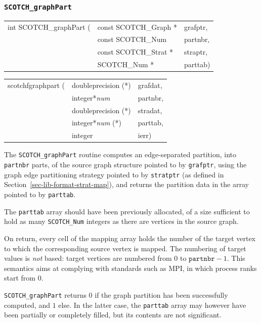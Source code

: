\subsubsection{{\tt SCOTCH\_graphPart}}

\begin{itemize}
\progsyn

{\tt\begin{tabular}{l@{}ll}
int SCOTCH\_graphPart ( & const SCOTCH\_Graph * & grafptr, \\
                        & const SCOTCH\_Num     & partnbr, \\
                        & const SCOTCH\_Strat * & straptr, \\
                        & SCOTCH\_Num *         & parttab)
\end{tabular}}

{\tt\begin{tabular}{l@{}ll}
scotchfgraphpart ( & doubleprecision (*)   & grafdat, \\
                   & integer*{\it num}     & partnbr, \\
                   & doubleprecision (*)   & stradat, \\
                   & integer*{\it num} (*) & parttab, \\
                   & integer               & ierr)
\end{tabular}}

\progdes

The {\tt SCOTCH\_graphPart} routine computes an edge-separated
partition, into {\tt partnbr} parts, of the source graph structure
pointed to by {\tt grafptr}, using the graph edge partitioning
strategy pointed to by {\tt stratptr} (as defined in
Section~\ref{sec-lib-format-strat-map}), and returns the partition
data in the array pointed to by {\tt parttab}.

The {\tt parttab} array should have been previously allocated, of a
size sufficient to hold as many {\tt SCOTCH\_\lbt Num} integers as
there are vertices in the source graph.

On return, every cell of the mapping array holds the number of the
target vertex to which the corresponding source vertex is mapped. The
numbering of target values is {\em not\/} based: target vertices are
numbered from $0$ to $\mathtt{partnbr} - 1$. This semantics aims at
complying with standards such as MPI, in which process ranks start
from $0$.

\progret

{\tt SCOTCH\_graphPart} returns $0$ if the graph partition has
been successfully computed, and $1$ else. In the latter case, the
{\tt parttab} array may however have been partially or completely
filled, but its contents are not significant.
\end{itemize}

